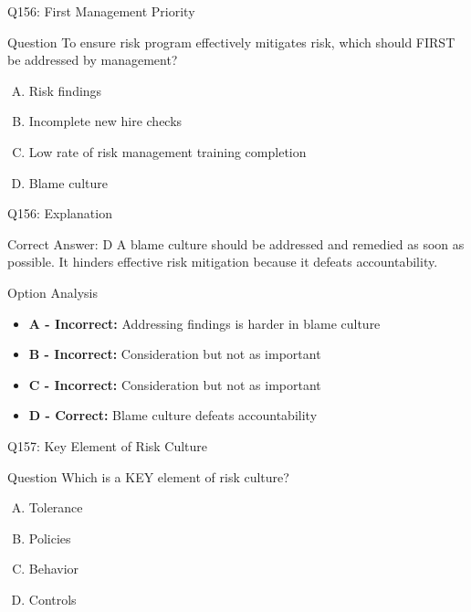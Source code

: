 \documentclass{beamer}
\begin{document}
	\begin{frame}{Q156: First Management Priority}
		\begin{block}{Question}
			To ensure risk program effectively mitigates risk, which should FIRST be addressed by management?
		\end{block}
		\begin{enumerate}[(A)]
			\item Risk findings
			\item Incomplete new hire checks
			\item Low rate of risk management training completion
			\item Blame culture
		\end{enumerate}
	\end{frame}
	
	\begin{frame}{Q156: Explanation}
		\begin{block}{Correct Answer: D}
			A blame culture should be addressed and remedied as soon as possible. It hinders effective risk mitigation because it defeats accountability.
		\end{block}
		\begin{block}{Option Analysis}
			\begin{itemize}
				\item \textbf{A - Incorrect:} Addressing findings is harder in blame culture
				\item \textbf{B - Incorrect:} Consideration but not as important
				\item \textbf{C - Incorrect:} Consideration but not as important
				\item \textbf{D - Correct:} Blame culture defeats accountability
			\end{itemize}
		\end{block}
	\end{frame}
	
	\begin{frame}{Q157: Key Element of Risk Culture}
		\begin{block}{Question}
			Which is a KEY element of risk culture?
		\end{block}
		\begin{enumerate}[(A)]
			\item Tolerance
			\item Policies
			\item Behavior
			\item Controls
		\end{enumerate}
	\end{frame}
	
\end{document}
